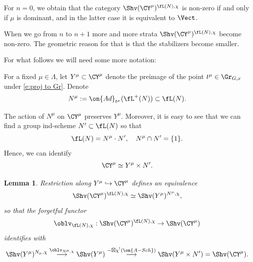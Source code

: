 \documentclass[9pt]{amsart}
\newtheorem{lem}[subsubsection]{Lemma}
\theoremstyle{definition}
\theoremstyle{remark}
\numberwithin{equation}{section}
\begin{document}

For $n=0$, we obtain that the category $\Shv(\CY^\mu)^{\fL(N),\chi}$ is non-zero if and only if $\mu$ is dominant,
and in the latter case it is equivalent to $\Vect$. 

\medskip

When we go from $n$ to $n+1$ more and more strata $\Shv(\CY^\mu)^{\fL(N),\chi}$ become non-zero. The geometric reason for that
is that the stabilizers become smaller. 

\sssec{}  \label{sss:Y mu}

For what follows we will need some more notation: 

\medskip

For a fixed $\mu\in \Lambda$, let $Y^\mu\subset \CY^\mu$ denote the preimage of the point $t^\mu\in \Gr_{G,x}$ 
under \eqref{e:proj to Gr}. Denote 
$$N^\mu:=\on{Ad}_{t^\mu}(\fL^+(N))\subset \fL(N).$$

\medskip

The action of $N^\mu$ on $\CY^\mu$ preserves $Y^\mu$. Moreover, it is 
easy to see that we can find a group ind-scheme $N'\subset \fL(N)$ so that
$$\fL(N)=N^\mu \cdot N', \quad N^\mu\cap N'=\{1\}.$$
Hence, we can identify 
$$\CY^\mu\simeq Y^\mu\times N'.$$

\begin{lem}  \label{l:reduce to fd}
Restriction along $Y^\mu\hookrightarrow \CY^\mu$ defines an equivalence
$$\Shv(\CY^\mu)^{\fL(N),\chi}\simeq \Shv(Y^\mu)^{N^\mu,\chi},$$
so that the forgetful functor
$$\oblv_{\fL(N),\chi}:\Shv(\CY^\mu)^{\fL(N),\chi}\to \Shv(\CY^\mu)$$
identifies with
$$\Shv(Y^\mu)^{N_\mu,\chi}\overset{\oblv_{N^\mu,\chi}} \longrightarrow 
\Shv(Y^\mu)\overset{-\boxtimes \chi^!(\on{A-Sch})}\longrightarrow 
\Shv(Y^\mu\times N')=\Shv(\CY^\mu).$$
\end{lem}
\end{document}
